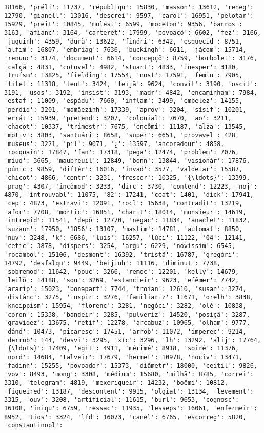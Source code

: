\documentclass[11pt]{article}
\begin{document}
\begin{Verbatim}[commandchars=\\\{\}]
18166, 'préli': 11737, 'républiqu': 15830, 'masson': 13612, 'reneg': 12790, 'gianell': 13016, 'descrei': 9597, 'carol': 16951, 'pelotar': 15929, 'preit': 10845, 'molest': 6599, 'moceton': 9356, 'barros': 3163, 'afianc': 3164, 'carteret': 17999, 'povoaçõ': 6602, 'fez': 3166, 'juquinh': 4359, 'durã': 13622, 'finóri': 6342, 'esquecid': 8751, 'alfim': 16807, 'embriag': 7636, 'buckingh': 6611, 'jácom': 15714, 'renunc': 3174, 'document': 6614, 'concepçõ': 8759, 'borbolet': 3176, 'calçã': 4831, 'cotovel': 4982, 'stuart': 4833, 'inesper': 3180, 'truísm': 13825, 'fielding': 17554, 'nost': 17591, 'femin': 7905, 'filet': 11318, 'tent': 3424, 'feijã': 9624, 'convit': 3190, 'oscil': 3191, 'usos': 3192, 'insist': 3193, 'madr': 4842, 'encaminham': 7984, 'estaf': 11009, 'espádu': 7660, 'inflam': 3499, 'embelez': 14155, 'perdid': 3201, 'mamãezinh': 17339, 'aprov': 3204, 'sísif': 10201, 'errát': 15939, 'pretend': 3207, 'colonial': 7670, 'ao': 3211, 'chacot': 10337, 'trimestr': 7675, 'encômi': 11187, 'alza': 13545, 'motiv': 3803, 'santuári': 8658, 'super': 6651, 'provavel': 428, 'museus': 3221, 'pil': 9071, '¿': 13597, 'ancoradour': 4858, 'rocquain': 17847, 'fan': 17318, 'pega': 12474, 'problem': 7076, 'miud': 3665, 'maubreuil': 12849, 'bonn': 13844, 'visionár': 17876, 'púnic': 9859, 'diftér': 16016, 'invad': 3577, 'valdetar': 15587, 'chicot': 4866, 'centr': 3231, 'frescor': 10325, '{\ldots}': 13399, 'prag': 4307, 'incômod': 3233, 'dirc': 3730, 'contend': 12223, 'noj': 4870, 'introuvabl': 11075, '82': 17241, 'ceat': 1401, 'dick': 17941, 'cep': 4873, 'extravi': 12091, 'rocl': 15638, 'contradit': 13219, 'afor': 7708, 'mortic': 16851, 'charit': 18014, 'monsieur': 14619, 'intrepid': 11541, 'depõ': 12770, 'negac': 11834, 'anaclet': 11832, 'suzann': 17950, '1856': 13107, 'mastim': 14781, 'automat': 8850, 'nuv': 3248, 'k': 6686, 'luis': 16257, 'lúci': 11122, '04': 12141, 'cetic': 3878, 'dispers': 3254, 'argu': 6229, 'novíssim': 6545, 'rocambol': 15106, 'desmont': 16392, 'tristã': 16787, 'gregóri': 14792, 'desfalqu': 9449, 'beijinh': 11116, 'diminut': 7738, 'sobremod': 11642, 'pouc': 3266, 'remoc': 12201, 'kelly': 14679, 'leilõ': 14188, 'sou': 3269, 'estancieir': 9623, 'efêmer': 7742, 'ararip': 15023, 'bonapart': 7744, 'troian': 12610, 'susan': 3274, 'distânc': 3275, 'inspir': 3276, 'familiariz': 11671, 'orelh': 3838, 'kneippism': 15954, 'florenc': 3281, 'negóci': 3282, 'olé': 10838, 'coron': 15338, 'bandeir': 3285, 'pulveriz': 14520, 'posiçã': 3287, 'gravidez': 13675, 'retif': 12278, 'arcabuz': 10965, 'olham': 9777, 'dând': 10473, 'picaresc': 17451, 'arrob': 11072, 'imperec': 9214, 'derrub': 144, 'desvi': 3295, 'xíc': 3296, 'lh': 13292, 'alij': 17764, '{\ldots}': 17409, 'egit': 4911, 'mérimé': 8918, 'soiré': 11376, 'nord': 14684, 'talveir': 17679, 'hermet': 10978, 'nociv': 13471, 'fadinh': 15255, 'povoador': 15373, 'diâmetr': 18000, 'ceitil': 9826, 'vov': 8493, 'mong': 3308, 'médium': 15680, 'milhã': 8785, 'correi': 3310, 'telegram': 4819, 'mexeriqueir': 14232, 'boêmi': 10812, 'figueired': 13187, 'descontent': 9915, 'olgiat': 13134, 'levement': 3315, 'ouv': 3208, 'artificial': 11615, 'burl': 9653, 'cognosc': 16108, 'iniqu': 6759, 'ressac': 11935, 'lesseps': 16061, 'enfermeir': 8952, 'tios': 3324, 'líd': 16073, 'canel': 6765, 'escorreg': 5820, 'constantinopl': 
\end{Verbatim}
\end{document}
